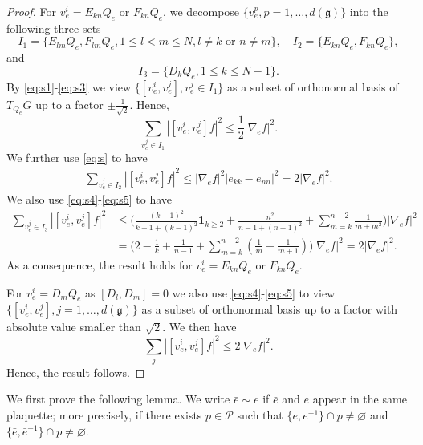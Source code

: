 \documentclass[11pt,UTF-8,reqno]{amsart}
\numberwithin{equation}{section}
\def\cP{{\mathcal P}}
\def\1{{\mathbf{1}}}
\def\geq{\geqslant}
\def\leq{\leqslant}
\def\le{\leqslant}
\let\emptyset\varnothing
\def\mfg{\mathfrak{g}}
\def\geq{\geqslant}
\def\leq{\leqslant}
\def\le{\leqslant}
\def\dg{d(\mfg)}
\begin{document}
\begin{proof}
For $v_e^i= E_{kn}Q_e$ or $F_{kn}Q_e$,  we decompose $\{v_e^p,p=1,\dots, \dg\}$ into the following three sets
$$I_1=\{E_{lm}Q_e, F_{lm}Q_e,1\leq l<m\leq N,l\neq k \text{ or } n\neq m\},\quad I_2=\{E_{kn}Q_e,F_{kn}Q_e\},$$
and 
$$I_3=\{D_kQ_e,1\leq k\leq N-1\}.$$
By \eqref{eq:s1}-\eqref{eq:s3} we view $\{[v_e^i,v_e^j], v_e^j\in I_1\}$ as 
a subset of orthonormal basis  of $T_{Q_e}G$ up to a factor $\pm \frac1{\sqrt 2}$. Hence, 
$$
\sum_{v_e^j\in I_1} |[v_e^i,v_e^j]f|^2 \leq \frac12|\nabla_ef|^2.
$$
We further use \eqref{eq:s} to have
\begin{align*}
\sum_{v_e^j\in I_2}|[v_e^i,v_e^j]f|^2\leq |\nabla_e f|^2|e_{kk}-e_{nn}|^2=2|\nabla_e f|^2. 
\end{align*}
We also use \eqref{eq:s4}-\eqref{eq:s5} to have
\begin{align*}
	\sum_{v_e^j\in I_3} |[v_e^i,v_e^j]f|^2
	&\leq \Big(\frac{(k-1)^2}{k-1+(k-1)^2}\1_{k\geq2}+\frac{n^2}{n-1+(n-1)^2}+\sum_{m=k}^{n-2}\frac1{m+m^2}\Big) |\nabla_ef|^2 
	\\
	&=\Big(2-\frac1k+\frac{1}{n-1}+\sum_{m=k}^{n-2}(\frac1m-\frac1{m+1})\Big)|\nabla_ef|^2=  2|\nabla_ef|^2.
\end{align*}
As a consequence, the result holds for $v_e^i=E_{kn}Q_e$ or $F_{kn}Q_e$. 

For $v_e^i=D_mQ_e$ as $[D_l,D_m]=0$ we also use \eqref{eq:s4}-\eqref{eq:s5}  to view $\{[v_e^i,v_e^j], j=1,\dots,\dg\}$ as a subset of orthonormal basis up to a factor with absolute value smaller than $\sqrt2$. We then have 
$$
\sum_j |[v_e^i,v_e^j]f|^2 \le2 |\nabla_ef|^2.
$$
Hence, the result follows. 
\end{proof}




We first prove the following lemma.
We write   $\bar e\sim e$ if $\bar e$ and $e$ appear in the same plaquette;
more precisely, if there exists $p\in \cP$ such that $\{e,e^{-1}\}\cap p \neq \emptyset$ and $\{\bar e,\bar e^{-1}\}\cap p \neq \emptyset$.
\end{document}
